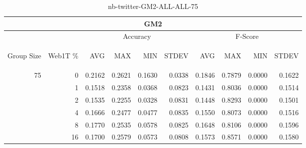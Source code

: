 \begin{center}
\begin{table}[htbp]
\begin{tabular}{ | r | r | r | r | r | r | r | r | r | r |}
\hline
\multicolumn{10}{|c|}{GM2}\\
\hline
 & & \multicolumn{4}{|c|}{Accuracy} & \multicolumn{4}{|c|}{F-Score}\\ \cline{3-10}
\begin{sideways}Group Size\end{sideways} & \begin{sideways}Web1T \%\end{sideways} & \begin{sideways}AVG\end{sideways} & \begin{sideways}MAX\end{sideways} & \begin{sideways}MIN\end{sideways} & \begin{sideways}STDEV\end{sideways} & \begin{sideways}AVG\end{sideways} & \begin{sideways}MAX\end{sideways} & \begin{sideways}MIN\end{sideways} & \begin{sideways}STDEV\end{sideways}\\
\hline
\multirow{5}{*}{75}
 & 0 & 0.2162 & 0.2621 & 0.1630 & 0.0338 & 0.1846 & 0.7879 & 0.0000 & 0.1622\\ \cline{2-10}
 & 1 & 0.1518 & 0.2358 & 0.0368 & 0.0823 & 0.1431 & 0.8036 & 0.0000 & 0.1514\\ \cline{2-10}
 & 2 & 0.1535 & 0.2255 & 0.0328 & 0.0831 & 0.1448 & 0.8293 & 0.0000 & 0.1501\\ \cline{2-10}
 & 4 & 0.1666 & 0.2477 & 0.0477 & 0.0835 & 0.1550 & 0.8073 & 0.0000 & 0.1516\\ \cline{2-10}
 & 8 & 0.1770 & 0.2535 & 0.0578 & 0.0825 & 0.1648 & 0.8106 & 0.0000 & 0.1596\\ \cline{2-10}
 & 16 & 0.1700 & 0.2579 & 0.0573 & 0.0808 & 0.1573 & 0.8571 & 0.0000 & 0.1580\\ \cline{2-10}
\hline
\end{tabular}
\caption{nb-twitter-GM2-ALL-ALL-75}
\label{table:nb-twitter-GM2-ALL-ALL-75}
\end{table}
\end{center}

